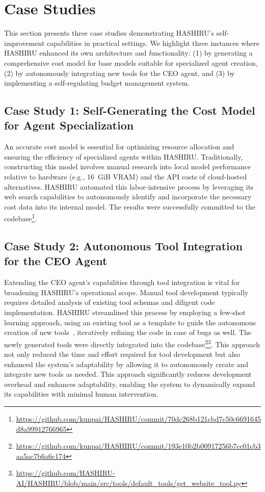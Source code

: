 \documentclass[conference]{IEEEtran}
\begin{document}
\section{Case Studies}
\label{sec:casestudies}
This section presents three case studies demonstrating HASHIRU's self-improvement capabilities in practical settings. We highlight three instances where HASHIRU enhanced its own architecture and functionality: (1) by generating a comprehensive cost model for base models suitable for specialized agent creation, (2) by autonomously integrating new tools for the CEO agent, and (3) by implementing a self-regulating budget management system.

\subsection{Case Study 1: Self-Generating the Cost Model for Agent Specialization}
\label{sec:casestudy1_costmodel}
An accurate cost model is essential for optimizing resource allocation and ensuring the efficiency of specialized agents within HASHIRU. Traditionally, constructing this model involves manual research into local model performance relative to hardware (e.g., 16~GiB VRAM) and the API costs of cloud-hosted alternatives. HASHIRU automated this labor-intensive process by leveraging its web search capabilities to autonomously identify and incorporate the necessary cost data into its internal model. The results were successfully committed to the codebase\footnote{\url{https://github.com/kunpai/HASHIRU/commit/70dc268b121cbd7c50c6691645d8a99912766965}}.

\subsection{Case Study 2: Autonomous Tool Integration for the CEO Agent}
\label{sec:casestudy2_tools}
Extending the CEO agent's capabilities through tool integration is vital for broadening HASHIRU's operational scope. Manual tool development typically requires detailed analysis of existing tool schemas and diligent code implementation. HASHIRU streamlined this process by employing a few-shot learning approach, using an existing tool as a template to guide the autonomous creation of new tools~\cite{brown2020language}, iteratively refining the code in case of bugs as well. The newly generated tools were directly integrated into the codebase\footnote{\url{https://github.com/kunpai/HASHIRU/commit/193e10b2b00917256b7cc01cb3aa5ac7b6a6c174}}\footnote{\url{https://github.com/HASHIRU-AI/HASHIRU/blob/main/src/tools/default_tools/get_website_tool.py}}. This approach not only reduced the time and effort required for tool development but also enhanced the system's adaptability by allowing it to autonomously create and integrate new tools as needed.
This approach significantly reduces development overhead and enhances adaptability, enabling the system to dynamically expand its capabilities with minimal human intervention.
\end{document}
